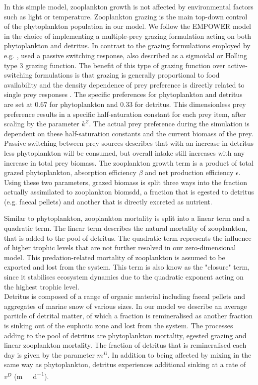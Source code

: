 \documentclass[template.tex]{subfiles}
\begin{document}
In this simple model, zooplankton growth is not affected by environmental factors such as light or temperature.
Zooplankton grazing is the main top-down control of the phytoplankton population in our model. We follow the EMPOWER model in the choice of implementing a multiple-prey grazing formulation acting on both phytoplankton and detritus. In contrast to the grazing formulations employed by e.g. \cite{Fasham1990a}, \citeauthor{Anderson2015c} used a passive switching response, also described as a sigmoidal or Holling type 3 grazing function. The benefit of this type of grazing function over active-switching formulations is that grazing is generally proportional to food availability and the density dependence of prey preference is directly related to single prey responses \citep{Gentleman2003a}.
The specific preferences for phytoplankton and detritus are set at 0.67 for phytoplankton and 0.33 for detritus. This dimensionless prey preference results in a specific half-saturation constant for each prey item, after scaling by the parameter $k^Z$. The actual prey preference during the simulation is dependent on these half-saturation constants and the current biomass of the prey. Passive switching between prey sources describes that with an increase in detritus less phytoplankton will be consumed, but overall intake still increases with any increase in total prey biomass. 
The zooplankton growth term is a product of total grazed phytoplankton, absorption efficiency $\beta$ and net production efficiency $\epsilon$. Using these two parameters, grazed biomass is split three ways into the fraction actually assimilated to zooplankton biomsdd, a fraction that is egested to detritus (e.g. faecal pellets) and another that is directly excreted as nutrient. 

Similar to phytoplankton, zooplankton mortality is split into a linear term and a quadratic term. The linear term describes the natural mortality of zooplankton, that is added to the pool of detritus. The quadratic term represents the influence of higher trophic levels that are not further resolved in our zero-dimensional model. This predation-related mortality of zooplankton is assumed to be exported and lost from the system.
This term is also know as the "closure" term, since it stabilises ecosystem dynamics due to the quadratic exponent acting on the highest trophic level.\\

Detritus is composed of a range of organic material including faecal pellets and aggregates of marine snow of various sizes. In our model we describe an average particle of detrital matter, of which a fraction is remineralised as another fraction is sinking out of the euphotic zone and lost from the system. The processes adding to the pool of detritus are phytoplankton mortality, egested grazing and linear zooplankton mortality. The fraction of detritus that is remineralised each day is given by the parameter $m
^D$. In addition to being affected by mixing in the same way as phytoplankton, detritus experiences additional sinking at a rate of $v^D$ (\unit{m \ d^{-1}}).\\
\end{document}
